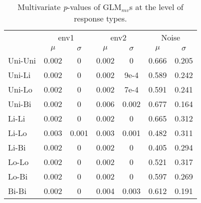 		\begin{table*}[h!] 
				
			\small
			\caption{Multivariate \textit{p}-values of GLM$_{mv}$s at the level of response types.}
			\centering
				
			\begin{tabular}{@{}lcccccc@{}}
					
				\toprule
				& \multicolumn{2}{c}{env1} & \multicolumn{2}{c}{env2} & \multicolumn{2}{c}{Noise}\\\cmidrule(l){2-3} \cmidrule(l){4-5} \cmidrule(l){6-7}
				& $\mu$ & $\sigma$ & $\mu$ & $\sigma$ & $\mu$ & $\sigma$\\
				\hline
				Uni-Uni & 0.002 & 0 & 0.002 & 0 & 0.666 & 0.205 \\
				Uni-Li  & 0.002 & 0 & 0.002 & 9e-4& 0.589 & 0.242 \\
				Uni-Lo  & 0.002 & 0 & 0.002 &  7e-4 & 0.591 & 0.241\\
				Uni-Bi  & 0.002 & 0 & 0.006 & 0.002 & 0.677 & 0.164\\
				Li-Li   & 0.002 & 0 & 0.002 & 0 & 0.665 & 0.312\\
				Li-Lo  & 0.003 &  0.001 & 0.003 & 0.001 & 0.482 & 0.311\\
				Li-Bi  & 0.002 & 0 & 0.002 & 0 & 0.405 &  0.294\\
				Lo-Lo  & 0.002 & 0 & 0.002 & 0 & 0.521 & 0.317\\
				Lo-Bi  & 0.002 & 0 & 0.002 & 0 & 0.597 & 0.269\\
				Bi-Bi  & 0.002 & 0 & 0.004 & 0.003 & 0.612 & 0.191\\
				\toprule
					
			\end{tabular}
			
			\label{tab:SMGLM2}
				
		\end{table*}
		
